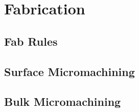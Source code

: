\section{Fabrication}

\subsection*{Fab Rules}

\subsection*{Surface Micromachining}

\subsection*{Bulk Micromachining}
